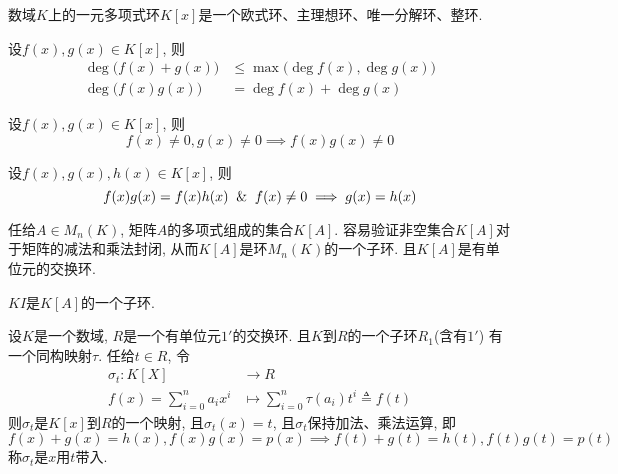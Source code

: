 \begin{Note}
数域$K$上的一元多项式环$K[x]$是一个欧式环、主理想环、唯一分解环、整环.
\end{Note}

\begin{Property}
设$f(x), g(x) \in K[x]$, 则
\[
\begin{aligned}
\deg \Big( f(x) + g(x) \Big) &\le \max \Big( \deg f(x), \deg g(x) \Big) \\
\deg \Big( f(x) g(x) \Big) &= \deg f(x) + \deg g(x) 
\end{aligned}
\]
\end{Property}

\begin{Corollary}
设$f(x), g(x) \in K[x]$, 则
\[
f(x) \neq 0, g(x) \neq 0 \implies f(x) g(x) \neq 0
\]
\end{Corollary}

\begin{Corollary}[消去律]
设$f(x), g(x), h(x) \in K[x]$, 则
\[
f(x) g(x) = f(x) h(x) \And f(x) \neq 0 \implies g(x) = h(x)
\]
\end{Corollary}


\begin{Note}
任给$A \in M_n(K)$, 矩阵$A$的多项式组成的集合$K[A]$. 容易验证非空集合$K[A]$对于矩阵的减法和乘法封闭, 从而$K[A]$是环$M_n(K)$的一个子环. 且$K[A]$是有单位元的交换环.
\end{Note}

\begin{Note}
$KI$是$K[A]$的一个子环.
\end{Note}

\begin{Theorem}[一元多项式环的通用性质]
设$K$是一个数域, $R$是一个有单位元$1'$的交换环. 且$K$到$R$的一个子环$R_1$(含有$1'$)
有一个同构映射$\tau$. 任给$t \in R$, 令
\[
\begin{aligned}
\sigma_t: K[X] &\rightarrow R \\
          f(x) = \sum\limits_{i=0}^n a_i x^i &\mapsto \sum\limits_{i=0}^n \tau(a_i) t^i \triangleq f(t)
\end{aligned}
\]
则$\sigma_t$是$K[x]$到$R$的一个映射, 且$\sigma_t(x) = t$, 且$\sigma_t$保持加法、乘法运算, 即
\[
f(x) +g(x) = h(x), f(x)g(x) = p(x) \implies f(t) + g(t) = h(t), f(t) g(t) = p(t)
\]
称$\sigma_t$是$x$用$t$带入.
\end{Theorem}

